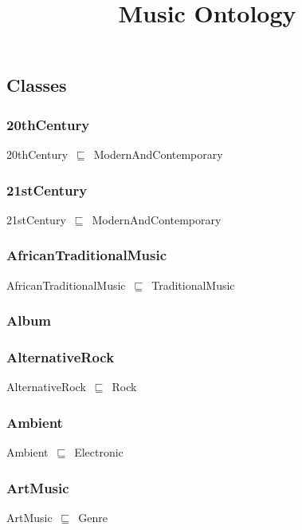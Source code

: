 \documentclass{article}
\title{Music Ontology}
\begin{document}
\maketitle

\subsection*{Classes}

\subsubsection*{20thCentury}

20thCentury~\ensuremath{\sqsubseteq}~ModernAndContemporary~

\subsubsection*{21stCentury}

21stCentury~\ensuremath{\sqsubseteq}~ModernAndContemporary~

\subsubsection*{AfricanTraditionalMusic}

AfricanTraditionalMusic~\ensuremath{\sqsubseteq}~TraditionalMusic~

\subsubsection*{Album}

\subsubsection*{AlternativeRock}

AlternativeRock~\ensuremath{\sqsubseteq}~Rock~

\subsubsection*{Ambient}

Ambient~\ensuremath{\sqsubseteq}~Electronic~

\subsubsection*{ArtMusic}

ArtMusic~\ensuremath{\sqsubseteq}~Genre~
\end{document}
